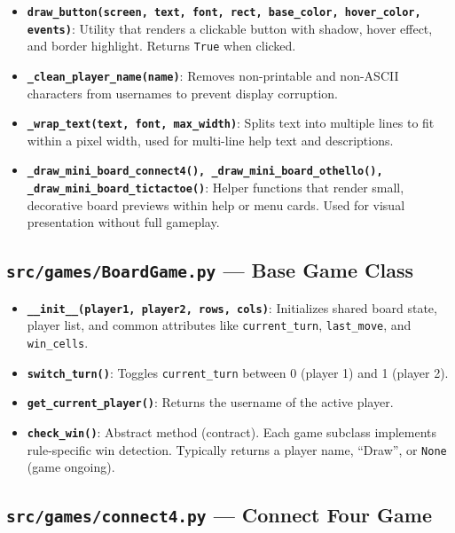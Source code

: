\documentclass[12pt,a4paper]{article}
\begin{document}
\begin{itemize}
    \item \textbf{\texttt{draw\_button(screen, text, font, rect, base\_color, hover\_color, events)}}: Utility that renders a clickable button with shadow, hover effect, and border highlight. Returns \texttt{True} when clicked.
    
    \item \textbf{\texttt{\_clean\_player\_name(name)}}: Removes non-printable and non-ASCII characters from usernames to prevent display corruption.
    
    \item \textbf{\texttt{\_wrap\_text(text, font, max\_width)}}: Splits text into multiple lines to fit within a pixel width, used for multi-line help text and descriptions.
    
    \item \textbf{\texttt{\_draw\_mini\_board\_connect4(), \_draw\_mini\_board\_othello(), \_draw\_mini\_board\_tictactoe()}}: Helper functions that render small, decorative board previews within help or menu cards. Used for visual presentation without full gameplay.
\end{itemize}

\subsection{\texttt{src/games/BoardGame.py} — Base Game Class}

\begin{itemize}
    \item \textbf{\texttt{\_\_init\_\_(player1, player2, rows, cols)}}: Initializes shared board state, player list, and common attributes like \texttt{current\_turn}, \texttt{last\_move}, and \texttt{win\_cells}.
    
    \item \textbf{\texttt{switch\_turn()}}: Toggles \texttt{current\_turn} between 0 (player 1) and 1 (player 2).
    
    \item \textbf{\texttt{get\_current\_player()}}: Returns the username of the active player.
    
    \item \textbf{\texttt{check\_win()}}: Abstract method (contract). Each game subclass implements rule-specific win detection. Typically returns a player name, ``Draw'', or \texttt{None} (game ongoing).
\end{itemize}

\subsection{\texttt{src/games/connect4.py} — Connect Four Game}
\end{document}
